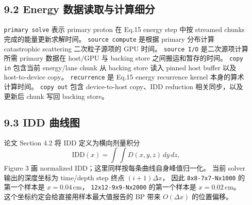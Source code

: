 \subsection*{9.2 Energy 数据读取与计算细分}
\begin{center}
\scriptsize
{}
\end{center}

\texttt{primary solve} 表示 primary proton 在 Eq.15 energy step 中按 streamed chunks 完成的能量更新求解时间。
\texttt{source compute} 是根据 primary 分布计算 catastrophic scattering 二次粒子源项的 GPU 时间。
\texttt{source I/O} 是二次源项计算所需 primary 数据在 host/GPU 与 backing store 之间搬运和暂存的时间。
\texttt{copy in} 包含当前 energy/lane chunk 从 backing store 读入 pinned host buffer 以及 host-to-device copy。
\texttt{recurrence} 是 Eq.15 energy recurrence kernel 本身的算术计算时间。
\texttt{copy out} 包含 device-to-host copy、IDD reduction 相关同步，以及更新后 chunk 写回 backing store。

\subsection*{9.3 IDD 曲线图}
论文 Section 4.2 将 IDD 定义为横向剂量积分
\[
  \mathrm{IDD}(x)=\int\!\!\int D(x,y,z)\,dy\,dz,
\]
Figure 3 画 normalized IDD；这里同样按每条曲线自身峰值归一化。
当前 solver 输出的深度坐标为 time/depth step 终点 $(i+1)\Delta x$，
因此 \texttt{8x8-7x7-Nx1000} 的第一个样本是 $x=0.04\,\mathrm{cm}$，
\texttt{12x12-9x9-Nx2000} 的第一个样本是 $x=0.02\,\mathrm{cm}$。
这个坐标约定会给直接用样本最大值报告的 BP 带来 $O(\Delta x)$ 的位置偏移。

